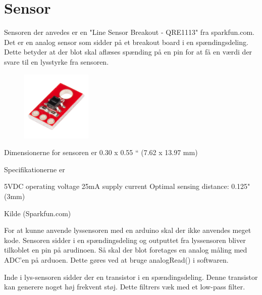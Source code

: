 \section{Sensor}
Sensoren der anvedes er en "Line Sensor Breakout - QRE1113" fra sparkfun.com. Det er en analog sensor som sidder på et breakout board i en spændingsdeling. Dette betyder at der blot skal aflæses spænding på en pin for at få en værdi der svare til en lysstyrke fra sensoren.

\begin{figure}[h!]
  \centering
  \includegraphics[width=0.3\textwidth]{figures/lyssensor.png}
\end{figure}

Dimensionerne for sensoren er 0.30 x 0.55 “ (7.62 x 13.97 mm) 

Specifikationerne er  

5VDC operating voltage
25mA supply current
Optimal sensing distance: 0.125" (3mm)

Kilde (Sparkfun.com)

For at kunne anvende lyssensoren med en arduino skal der ikke anvendes meget kode. Sensoren sidder i en spændingsdeling og outputtet fra lyssensoren bliver tilkoblet en pin på arudinoen. Så skal der blot foretages en analog måling med ADC'en på arduoen. 
Dette gøres ved at bruge analogRead() i softwaren.


Inde i lys-sensoren sidder der en transistor i en spændingsdeling. Denne transistor kan generere noget høj frekvent støj. Dette filtrers væk med et low-pass filter.